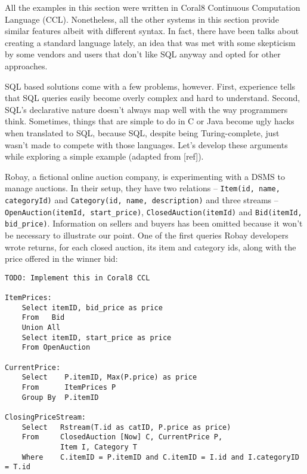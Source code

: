 \documentclass{report}
\begin{document}
All the examples in this section were written in Coral8 Continuous Computation Language (CCL). Nonetheless, all the other systems in this section provide similar features albeit with different syntax. In fact, there have been talks about creating a standard language lately, an idea that was met with some skepticism by some vendors and users that don't like SQL anyway and opted for other approaches.

SQL based solutions come with a few problems, however. First, experience tells that SQL queries easily become overly complex and hard to understand. Second, SQL's declarative nature doesn't always map well with the way programmers think. Sometimes, things that are simple to do in C or Java become ugly hacks when translated to SQL, because SQL, despite being Turing-complete, just wasn't made to compete with those languages. Let's develop these arguments while exploring a simple example (adapted from [ref]).

Robay, a fictional online auction company, is experimenting with a DSMS to manage auctions. In their setup, they have two relations -- \verb=Item(id, name, categoryId)= and \verb=Category(id, name, description)= and three streams -- \verb=OpenAuction(itemId, start_price)=, \verb=ClosedAuction(itemId)= and \verb=Bid(itemId, bid_price)=. Information on sellers and buyers has been omitted because it won't be necessary to illustrate our point. One of the first queries Robay developers wrote returns, for each closed auction, its item and category ids, along with the price offered in the winner bid:

\begin{verbatim}
TODO: Implement this in Coral8 CCL

ItemPrices:
    Select itemID, bid_price as price 
    From   Bid 
    Union All
    Select itemID, start_price as price 
    From OpenAuction

CurrentPrice: 
    Select    P.itemID, Max(P.price) as price
    From      ItemPrices P
    Group By  P.itemID

ClosingPriceStream:
    Select   Rstream(T.id as catID, P.price as price)
    From     ClosedAuction [Now] C, CurrentPrice P, 
             Item I, Category T    
    Where    C.itemID = P.itemID and C.itemID = I.id and I.categoryID = T.id 
\end{verbatim}
\end{document}
